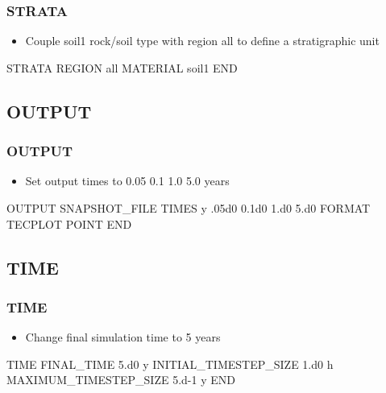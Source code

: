 \documentclass{beamer}
\newcommand\greencomment[1]{{{\color{green} #1}}}
\newcommand\magentacomment[1]{{{\color{magenta} #1}}}
\begin{document}
\begin{frame}[fragile]\frametitle{STRATA}

\begin{itemize}
\item Couple \greencomment{soil1} rock/soil type with region \greencomment{all} to define a stratigraphic unit
\end{itemize}

\begin{semiverbatim}

STRATA
  REGION all
  MATERIAL soil1
END


\end{semiverbatim}

\end{frame}

\subsection{OUTPUT}

\begin{frame}[fragile]\frametitle{OUTPUT}

\begin{itemize}
\item Set output times to 0.05 0.1 1.0 5.0 years
\end{itemize}


\begin{semiverbatim}

OUTPUT
  SNAPSHOT_FILE
  \magentacomment{TIMES y  .05d0 0.1d0 1.d0 5.d0}   
  FORMAT TECPLOT POINT            
END

\end{semiverbatim}

\end{frame}

\subsection{TIME}

\begin{frame}[fragile]\frametitle{TIME}

\begin{itemize}
\item Change final simulation time to 5 years
\end{itemize}

\begin{semiverbatim}

TIME
  FINAL_TIME \magentacomment{5.d0} y
  INITIAL_TIMESTEP_SIZE 1.d0 h
  MAXIMUM_TIMESTEP_SIZE 5.d-1 y
END

\end{semiverbatim}

\end{frame}
\end{document}
